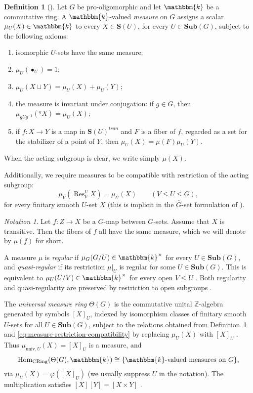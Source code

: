 \documentclass[11pt,a4paper]{amsart}
\theoremstyle{plain}%
\theoremstyle{definition}
\newtheorem{definition}[lemma]{Definition}
\theoremstyle{remark}
\newtheorem{notation}[lemma]{Notation}
\newcommand{\Hom}{\operatorname{Hom}}
\newcommand{\Res}{\operatorname{Res}}
\newcommand{\kk}{\mathbbm{k}}
\newcommand{\Sub}{\mathbf{Sub}}
\newcommand{\Set}[1]{\mathbf{S}(#1)}
\begin{document}
\begin{definition}[{\cite[Definition~3.1]{HS-oligomorphic}}]\label{def:measure}
Let $G$ be pro-oligomorphic and let $\kk$ be a commutative ring. A $\kk$-valued
\emph{measure} on $G$ assigns a scalar $\mu_U(X)\in \kk$ to every $X\in \Set{U}$, for every $U\in \Sub(G)$, subject to the following axioms:
\begin{enumerate}
\item isomorphic $U$-sets have the same measure;
\item $\mu_U({\bullet_U})=1$;
\item $\mu_U(X\sqcup Y)=\mu_U(X)+\mu_U(Y)$;
\item the measure is invariant under conjugation: if $g\in G$, then
      $\mu_{gUg^{-1}}({}^{g}X)=\mu_U(X)$;
\item if $f:X\to Y$ is a map in $\Set{U}^{tran}$ and $F$ is
      a fiber of $f$, regarded as a set for the stabilizer of a point of $Y$, then
      $\mu_U(X)=\mu(F)\mu_U(Y)$.
\end{enumerate}
When the acting subgroup is clear, we write simply $\mu(X)$.
\end{definition}

Additionally, we require measures to be compatible with restriction of the acting
subgroup:
\begin{equation}\label{eq:measure-restriction-compatibility}
  \mu_V(\Res^U_V X)=\mu_U(X)
  \qquad (V\leq U\leq G),
\end{equation}
for every finitary smooth $U$-set $X$ (this is implicit in the
$\widehat G$-set formulation of
\cite[\S2.5 and Definition~3.1]{HS-oligomorphic}).

\begin{notation}
Let $f:Z\to X$ be a $G$-map between $G$-sets. Assume that $X$ is transitive. Then the fibers of $f$ all have the same measure, which we will denote by $\mu(f)$ for short.
\end{notation}


A measure $\mu$ is \emph{regular} if
$\mu_G(G/U)\in\kk^\times$ for every $U\in\Sub(G)$, and
\emph{quasi-regular} if its restriction $\mu|_U$ is regular for some
$U\in\Sub(G)$. This is equivalent to
$\mu_U(U/V)\in\kk^\times$ for every open $V\leq U$
\cite[Definition~3.18]{HS-oligomorphic}.
Both regularity and quasi-regularity are preserved by restriction to open subgroups \cite[Proposition~3.20]{HS-oligomorphic}.

The \emph{universal measure ring} $\Theta(G)$ is the commutative unital
$\mathbb Z$-algebra generated by symbols $[X]_U$, indexed by isomorphism
classes of finitary smooth $U$-sets for all $U\in\Sub(G)$, subject to the
relations obtained from Definition~\ref{def:measure} and
\eqref{eq:measure-restriction-compatibility} by replacing
$\mu_U(X)$ with $[X]_U$
\cite[Definition~3.6]{HS-oligomorphic}.
Thus $\mu_{\mathrm{univ},U}(X)=[X]_U$ is a measure, and
\[
  \Hom_{\mathrm{CRing}}(\Theta(G),\kk)
  \cong \{\text{$\kk$-valued measures on $G$}\},
\]
via $\mu_U(X)=\varphi([X]_U)$ (we usually suppress $U$ in the notation). The multiplication satisfies $[X][Y]=[X\times Y]$ \cite[Remark~3.7]{HS-oligomorphic}.
\end{document}
